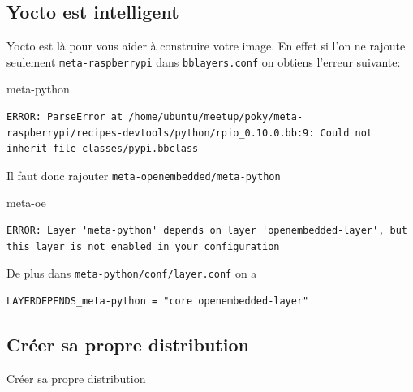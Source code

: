 \documentclass[compress]{smilebeamer}
\begin{document}
\subsection{Yocto est intelligent}
\begin{frame}[fragile]
Yocto est là pour vous aider à construire votre image.\newline
En effet si l'on ne rajoute seulement \texttt{meta-raspberrypi} dans \texttt{bblayers.conf} on obtiens l'erreur suivante:

\begin{block}{meta-python}
\begin{lstlisting}[basicstyle=\footnotesize\ttfamily\color{red!80!black!60}]
ERROR: ParseError at /home/ubuntu/meetup/poky/meta-raspberrypi/recipes-devtools/python/rpio_0.10.0.bb:9: Could not inherit file classes/pypi.bbclass
\end{lstlisting}
Il faut donc rajouter \texttt{meta-openembedded/meta-python}
\end{block}

\begin{block}{meta-oe}
\begin{lstlisting}[basicstyle=\footnotesize\ttfamily\color{red!80!black!60}]
ERROR: Layer 'meta-python' depends on layer 'openembedded-layer', but this layer is not enabled in your configuration
\end{lstlisting}
De plus dans \texttt{meta-python/conf/layer.conf} on a
\begin{lstlisting}[style=bitbake]
LAYERDEPENDS_meta-python = "core openembedded-layer"
\end{lstlisting}
\end{block}
\end{frame}


\subsection{Créer sa propre distribution}
\begin{frame}
\begin{center}
\huge{Créer sa propre distribution}
\end{center}
\end{frame}
\end{document}
